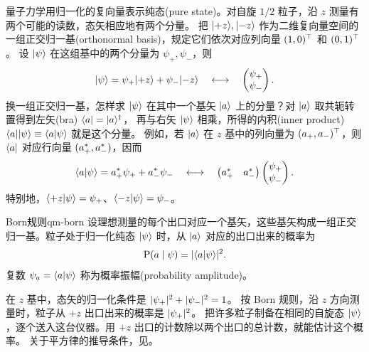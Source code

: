 量子力学用归一化的复向量表示纯态(pure state)。对自旋 $1/2$ 粒子，沿 $z$ 测量有两个可能的读数，态矢相应地有两个分量。
把 $\lvert+z\rangle,\lvert-z\rangle$ 作为二维复向量空间的一组正交归一基(orthonormal basis)，规定它们依次对应列向量
$(1,0)^\top$ 和 $(0,1)^\top$。
设 $\lvert\psi\rangle$ 在这组基中的两个分量为 $\psi_+,\psi_-$，则
\begin{equation}
    \lvert\psi\rangle = \psi_+\lvert+z\rangle + \psi_-\lvert-z\rangle
    \quad \longleftrightarrow \quad
    \begin{pmatrix}\psi_+\\\psi_-\end{pmatrix}.
\end{equation}
换一组正交归一基，怎样求 $\lvert\psi\rangle$ 在其中一个基矢 $\lvert a\rangle$ 上的分量？对 $\lvert a\rangle$ 取共轭转置得到左矢(bra) $\langle a\rvert = \lvert a\rangle^\dagger$，
再与右矢 $\lvert\psi\rangle$ 相乘，所得的内积(inner product) $\langle a\rvert\lvert\psi\rangle \equiv \langle a\vert\psi\rangle$ 就是这个分量。
例如，若 $\lvert a\rangle$ 在 $z$ 基中的列向量为 $(a_+,a_-)^\top$，则 $\langle a\rvert$ 对应行向量 $(a_+^\ast,a_-^\ast)$，因而
\begin{equation}
    \langle a\vert\psi\rangle = a_+^\ast \psi_+ + a_-^\ast \psi_-
    \quad \longleftrightarrow \quad
    \begin{pmatrix}a_+^\ast & a_-^\ast\end{pmatrix}
    \begin{pmatrix}\psi_+\\\psi_-\end{pmatrix}.
\end{equation}
特别地，$\langle+z\vert\psi\rangle = \psi_+$、$\langle-z\vert\psi\rangle = \psi_-$。
\begin{postulate}{Born规则}{qm-born}
    设理想测量的每个出口对应一个基矢，这些基矢构成一组正交归一基。粒子处于归一化纯态 $\lvert\psi\rangle$ 时，从 $\lvert a\rangle$ 对应的出口出来的概率为
    \begin{equation}
        \operatorname{P}(a \mid \psi) = \lvert\langle a\vert\psi\rangle\rvert^2 .
        \label{eq:born-amplitude}
    \end{equation}
    复数 $\psi_a = \langle a\vert\psi\rangle$ 称为概率振幅(probability amplitude)。
\end{postulate}
\begin{remark}
    在 $z$ 基中，态矢的归一化条件是 $\lvert\psi_+\rvert^2 + \lvert\psi_-\rvert^2 = 1$。
    按 Born 规则，沿 $z$ 方向测量时，粒子从 $+z$ 出口出来的概率是 $\lvert\psi_+\rvert^2$。
    把许多粒子制备在相同的自旋态 $\lvert\psi\rangle$，逐个送入这台仪器。用 $+z$ 出口的计数除以两个出口的总计数，就能估计这个概率。
    关于平方律的推导条件，见。
\end{remark}

